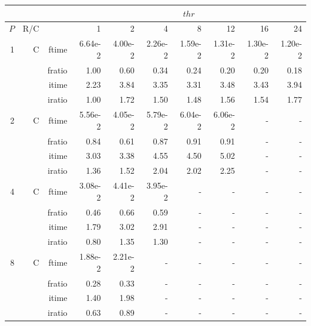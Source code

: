 \documentclass[a4paper]{article}
\begin{document}
\begin{table}[htbp]
\begin{center}
\begin{small}
\begin{tabular}{|r|r|r|r|r|r|r|r|r|r|}
\hline 
     & & & \multicolumn{7}{c|}{$thr$} \\ \hline
    $P$ & R/C &  & 1           & 2    & 4    & 8    & 12   & 16    & 24  \\ \hline\hline

      1  &   C &   ftime &   6.64e-2 &    4.00e-2 &    2.26e-2 &    1.59e-2 &    1.31e-2 &    1.30e-2 &    1.20e-2 \\
           &            &  fratio &    1.00 &    0.60 &    0.34 &    0.24 &    0.20 &    0.20 &    0.18 \\
           &            &  itime &   2.23  &    3.84  &    3.35  &    3.31  &    3.48  &    3.43  &    3.94  \\
           &            &  iratio &    1.00 &    1.72 &    1.50 &    1.48 &    1.56 &    1.54 &    1.77  \\\hline
   2  &   C &   ftime &   5.56e-2 &    4.05e-2 &    5.79e-2 &    6.04e-2 &    6.06e-2 &   - &   - \\
           &            &  fratio &   0.84 &    0.61 &    0.87 &    0.91 &    0.91 &   - &   - \\
           &            &  itime &   3.03  &    3.38  &    4.55  &    4.50  &    5.02  &   - &   - \\
           &            &  iratio &   1.36 &    1.52 &    2.04 &    2.02 &    2.25 &   - &   - \\\hline
   4  &   C &   ftime &   3.08e-2 &    4.41e-2 &    3.95e-2 &   - &   - &   - &   - \\
           &            &  fratio &   0.46 &    0.66 &    0.59 &   - &   - &   - &   - \\
           &            &  itime &   1.79  &    3.02  &    2.91  &   - &   - &   - &   - \\
           &            &  iratio &   0.80 &    1.35 &    1.30 &   - &   - &   - &   - \\\hline
   8  &   C &   ftime &   1.88e-2 &    2.21e-2 &   - &   - &   - &   - &   - \\
           &            &  fratio &   0.28 &    0.33 &   - &   - &   - &   - &   - \\
           &            &  itime &   1.40  &    1.98  &   - &   - &   - &   - &   - \\
           &            &  iratio &   0.63 &    0.89 &   - &   - &   - &   - &   - \\\hline

\end{tabular}
\end{small}
\end{center}
\end{table}
\end{document}
